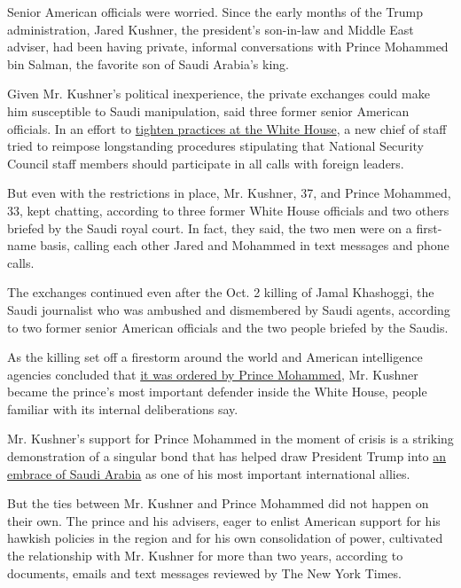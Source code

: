 Senior American officials were worried. Since the early months of the
Trump administration, Jared Kushner, the president's son-in-law and
Middle East adviser, had been having private, informal conversations
with Prince Mohammed bin Salman, the favorite son of Saudi Arabia's
king.

Given Mr. Kushner's political inexperience, the private exchanges could
make him susceptible to Saudi manipulation, said three former senior
American officials. In an effort to
\href{https://www.nytimes.com/2017/08/03/us/politics/john-kelly-chief-of-staff-trump.html}{tighten
practices at the White House}, a new chief of staff tried to reimpose
longstanding procedures stipulating that National Security Council staff
members should participate in all calls with foreign leaders.

But even with the restrictions in place, Mr. Kushner, 37, and Prince
Mohammed, 33, kept chatting, according to three former White House
officials and two others briefed by the Saudi royal court. In fact, they
said, the two men were on a first-name basis, calling each other Jared
and Mohammed in text messages and phone calls.

The exchanges continued even after the Oct. 2 killing of Jamal
Khashoggi, the Saudi journalist who was ambushed and dismembered by
Saudi agents, according to two former senior American officials and the
two people briefed by the Saudis.

As the killing set off a firestorm around the world and American
intelligence agencies concluded that
\href{https://www.nytimes.com/2018/11/16/us/politics/cia-saudi-crown-prince-khashoggi.html}{it
was ordered by Prince Mohammed}, Mr. Kushner became the prince's most
important defender inside the White House, people familiar with its
internal deliberations say.

Mr. Kushner's support for Prince Mohammed in the moment of crisis is a
striking demonstration of a singular bond that has helped draw President
Trump into
\href{https://www.nytimes.com/2018/11/20/world/middleeast/trump-saudi-khashoggi.html}{an
embrace of Saudi Arabia} as one of his most important international
allies.

But the ties between Mr. Kushner and Prince Mohammed did not happen on
their own. The prince and his advisers, eager to enlist American support
for his hawkish policies in the region and for his own consolidation of
power, cultivated the relationship with Mr. Kushner for more than two
years, according to documents, emails and text messages reviewed by The
New York Times.

